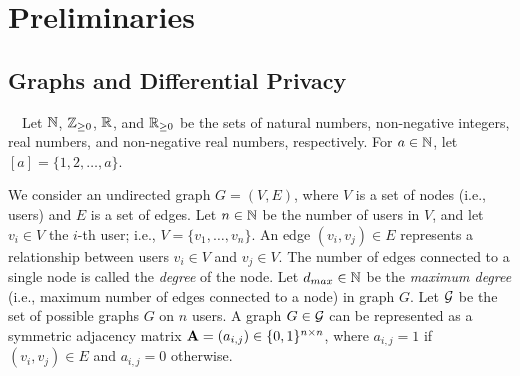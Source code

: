 \section{Preliminaries}
\label{chap1-sec:preliminaries}

\subsection{Graphs and Differential Privacy}
\label{chap1-sub:graphs_CDP}
~~Let $\mathbb{N}$, $\mathbb{Z}_{\ge0}$, $\mathbb{R}$, and $\mathbb{R}_{\ge0}$ be the sets of natural numbers, non-negative integers, real numbers, and non-negative real numbers, respectively. 
For $a \in \mathbb{N}$, let $[a] = \{1, 2, \ldots, a\}$. 

We consider an undirected graph $G=(V,E)$, where 
$V$ is a set of nodes (i.e., users) and $E$ is a set of edges. 
Let $n \in \mathbb{N}$ be the number of users in $V$, and let $v_i \in V$ the $i$-th user; i.e., $V=\{v_1,\ldots,v_n\}$. 
An edge $(v_i, v_j) \in E$ represents a relationship between users $v_i \in V$ and $v_j \in V$. 
The number of edges connected to a single node is called the \textit{degree} of the node. 
Let $d_{max} \in \mathbb{N}$ be the \textit{maximum degree} (i.e., maximum number of edges connected to a node) in graph $G$. 
Let $\mathcal{G}$ be the set of possible graphs 
$G$ on $n$ users. 
A graph $G \in \mathcal{G}$ can be represented as a symmetric adjacency matrix $\mathbf{A}=(a_{i,j}) \in \{0,1\}^{n \times n}$, where $a_{i,j}=1$ if $(v_i,v_j) \in E$ and $a_{i,j}=0$ otherwise.

